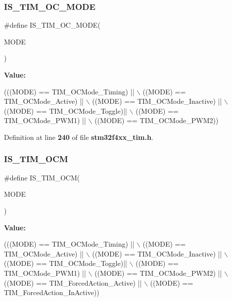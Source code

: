 \subsubsection{I\+S\+\_\+\+T\+I\+M\+\_\+\+O\+C\+\_\+\+M\+O\+DE}
{\footnotesize\ttfamily \#define I\+S\+\_\+\+T\+I\+M\+\_\+\+O\+C\+\_\+\+M\+O\+DE(\begin{DoxyParamCaption}\item[{}]{M\+O\+DE }\end{DoxyParamCaption})}

{\bfseries Value\+:}
\begin{DoxyCode}
(((MODE) == TIM_OCMode_Timing) || \(\backslash\)
                              ((MODE) == TIM_OCMode_Active) || \(\backslash\)
                              ((MODE) == TIM_OCMode_Inactive) || \(\backslash\)
                              ((MODE) == TIM_OCMode_Toggle)|| \(\backslash\)
                              ((MODE) == TIM_OCMode_PWM1) || \(\backslash\)
                              ((MODE) == TIM_OCMode_PWM2))
\end{DoxyCode}


Definition at line \textbf{ 240} of file \textbf{ stm32f4xx\+\_\+tim.\+h}.

\mbox{\label{group__TIM__Output__Compare__and__PWM__modes_ga45f530dd241d3b0787b5c2d62cd1b98f}} 
\subsubsection{I\+S\+\_\+\+T\+I\+M\+\_\+\+O\+CM}
{\footnotesize\ttfamily \#define I\+S\+\_\+\+T\+I\+M\+\_\+\+O\+CM(\begin{DoxyParamCaption}\item[{}]{M\+O\+DE }\end{DoxyParamCaption})}

{\bfseries Value\+:}
\begin{DoxyCode}
(((MODE) == TIM_OCMode_Timing) || \(\backslash\)
                          ((MODE) == TIM_OCMode_Active) || \(\backslash\)
                          ((MODE) == TIM_OCMode_Inactive) || \(\backslash\)
                          ((MODE) == TIM_OCMode_Toggle)|| \(\backslash\)
                          ((MODE) == TIM_OCMode_PWM1) || \(\backslash\)
                          ((MODE) == TIM_OCMode_PWM2) ||    \(\backslash\)
                          ((MODE) == TIM_ForcedAction_Active) || \(\backslash\)
                          ((MODE) == TIM_ForcedAction_InActive))
\end{DoxyCode}


